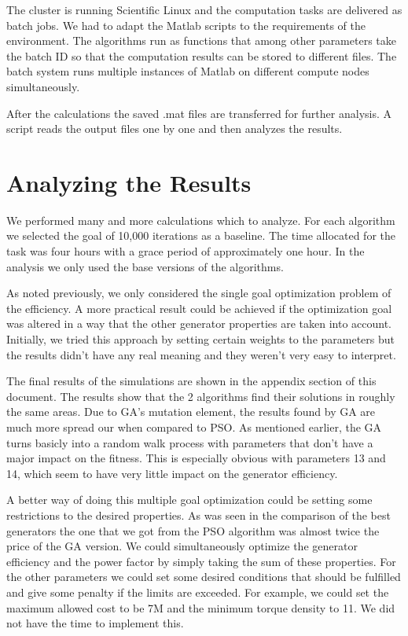 \documentclass[twoside]{article}
\begin{document}
\begin{multicols}{2}
	The cluster is running Scientific Linux and the computation tasks are delivered as batch jobs. We had to adapt the Matlab scripts to the requirements of the environment. The algorithms run as functions that among other parameters take the batch ID so that the computation results can be stored to different files. The batch system runs multiple instances of Matlab on different compute nodes simultaneously. 
	
	After the calculations the saved .mat files are transferred for further analysis. A script reads the output files one by one and then analyzes the results.
	
	
	
\section{Analyzing the Results}
We performed many and more calculations which to analyze. For each algorithm we selected the goal of 10,000 iterations as a baseline. The time allocated for the task was four hours with a grace period of approximately one hour. In the analysis we only used the base versions of the algorithms. 

As noted previously, we only considered the single goal optimization problem of the efficiency. A more practical result could be achieved if the optimization goal was altered in a way that the other generator properties are taken into account. Initially, we tried this approach by setting certain weights to the parameters but the results didn't have any real meaning and they weren't very easy to interpret. 

The final results of the simulations are shown in the appendix section of this document. The results show that the 2 algorithms find their solutions in roughly the same areas. Due to GA's mutation element, the results found by GA are much more spread our when compared to PSO. As mentioned earlier, the GA turns basicly into a random walk process with parameters that don't have a major impact on the fitness. This is especially obvious with parameters 13 and 14, which seem to have very little impact on the generator efficiency.

A better way of doing this multiple goal optimization could be setting some restrictions to the desired properties. As was seen in the comparison of the best generators the one that we got from the PSO algorithm was almost twice the price of the GA version. We could simultaneously optimize the generator efficiency and the power factor by simply taking the sum of these properties. For the other parameters we could set some desired conditions that should be fulfilled and give some penalty if the limits are exceeded. For example, we could set the maximum allowed cost to be 7M and the minimum torque density to 11. We did not have the time to implement this.



\end{multicols}
\end{document}
